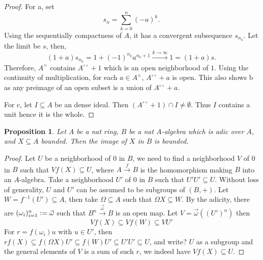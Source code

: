 \documentclass[8pt]{article}
\numberwithin{equation}{section}
\newtheorem{proposition}{Proposition}[subsection]
\newcommand{\defeq}{\vcentcolon=}
\newcommand{\dcirc}[0]{{\circ\circ}}
\begin{document}
\begin{proof}
    For a, set
    \begin{equation*}
        s_n = \sum_{k=0}^n (-a)^k.
    \end{equation*}
    Using the sequentially compactness of $A$, it has a convergent subsequence $s_{n_k}$. Let the limit be $s$, then,
    \begin{equation*}
        (1+a)s_{n_k} = 1+(-1)^{n_k}a^{n_k+1}\stackrel{k\to\infty}{\to}1 = (1+a)s.
    \end{equation*}
    Therefore, $A^\times$ contains $A^\dcirc+1$ which is an open neighborhood of $1$. Using the continuity of multiplication, for each $a\in A^\times$, $A^\dcirc +a$ is open. This also shows b as any preimage of an open subset is a union of $A^\dcirc+a$.
    \par For c, let $I\subseteq A$ be an dense ideal. Then $(A^{\dcirc}+1)\cap I\not=\emptyset$. Thus $I$ contains a unit hence it is the whole.%
\end{proof}

\begin{proposition}
    \label{fact_17_6}
    Let $A$ be a nat ring, $B$ be a nat $A$-algebra which is adic over $A$, and $X\subseteq A$ bounded. Then the image of $X$ in $B$ is bounded.
\end{proposition}

\begin{proof}
    Let $U$ be a neighborhood of $0$ in $B$, we need to find a neighborhood $V$ of $0$ in $B$ such that $Vf(X)\subseteq U$, where $A\stackrel{f}{\to}B$ is the homomorphism making $B$ into an $A$-algebra. Take a neighborhood $U'$ of $0$ in $B$ such that $U'U'\subseteq U$. Without loss of generality, $U$ and $U'$ can be assumed to be subgroups of $(B,+)$. 
    Let $W=f^{-1}(U')\subseteq A$, then take $\Omega\subseteq A$ such that $\Omega X\subseteq W$. By the adicity, there are $(\omega_i)_{i=1}^n\defeq\vec{\omega}$ such that $B^n\stackrel{\vec{\omega}}{\to}B$ is an open map. 
    Let $V = \vec{\omega}((U')^n)$ then 
    \begin{equation*}
        Vf(X)\subseteq Vf(W)\subseteq V U'
    \end{equation*} For $r = f(\omega_i)u$ with $u\in U'$, then 
    $rf(X) \subseteq f(\Omega X)U'\subseteq f(W)U'\subseteq U'U'\subseteq U$, and write? $U$ as a subgroup and the general elements of $V$ is a sum of such $r$, we indeed have $Vf(X)\subseteq U$. 
\end{proof}
\end{document}
